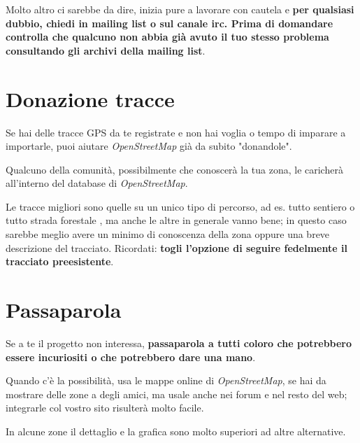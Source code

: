 \documentclass[a4paper,twoside,12pt,]{article}
\newcommand{\osm}{\emph{OpenStreetMap}\xspace}
\newcommand{\gps}{GPS\xspace}
\begin{document}
Molto altro ci sarebbe da dire, inizia pure a lavorare con cautela e \textbf{per qualsiasi dubbio, chiedi in mailing list o sul canale irc. \newline
Prima di domandare controlla che qualcuno non abbia già avuto il tuo stesso problema consultando gli archivi della mailing list}.


\section{Donazione tracce}
Se hai delle tracce \gps da te registrate e non hai voglia o tempo di imparare a importarle, puoi aiutare \osm già da subito "donandole".

Qualcuno della comunità, possibilmente che conoscerà la tua zona, le caricherà all'interno del database di \osm.

Le tracce migliori sono quelle su un unico tipo di percorso, ad es. tutto sentiero o tutto strada forestale , ma anche le altre in generale vanno bene; in questo caso sarebbe meglio avere un minimo di conoscenza della zona oppure una breve descrizione del tracciato. Ricordati: \textbf{togli l'opzione di seguire fedelmente il tracciato preesistente}.
\section{Passaparola}
Se a te il progetto non interessa, \textbf{passaparola a tutti coloro che potrebbero essere incuriositi o che potrebbero dare una mano}.

Quando c'è la possibilità, usa le mappe online di \osm, se hai da mostrare delle zone a degli amici, ma usale anche nei forum e nel resto del web; integrarle col vostro sito risulterà molto facile. %
 
In alcune zone il dettaglio e la grafica sono molto superiori ad altre alternative.
\end{document}
